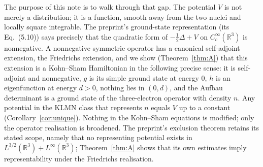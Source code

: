 \documentclass[11pt,a4paper]{article}
\theoremstyle{plain}
\theoremstyle{definition}
\theoremstyle{remark}
\newcommand{\R}{\mathbb{R}}
\newcommand{\LL}{L^{3/2}(\R^3)+L^\infty(\R^3)}
\begin{document}
The purpose of this note is to walk through that gap. The potential $V$ is not merely a distribution; it is a function, smooth away from the two nuclei and locally square integrable. The preprint's ground-state representation (its Eq.~(5.10)) says precisely that the quadratic form of $-\tfrac12\Delta+V$ on $C_c^\infty(\R^3)$ is nonnegative. A nonnegative symmetric operator has a canonical self-adjoint extension, the Friedrichs extension, and we show (Theorem~\ref{thm:A}) that this extension is a Kohn--Sham Hamiltonian in the following precise sense: it is self-adjoint and nonnegative, $g$ is its simple ground state at energy $0$, $h$ is an eigenfunction at energy $d>0$, nothing lies in $(0,d)$, and the Aufbau determinant is a ground state of the three-electron operator with density $n$. Any potential in the KLMN class that represents $n$ equals $V$ up to a constant (Corollary~\ref{cor:unique}). Nothing in the Kohn--Sham equations is modified; only the operator realisation is broadened. The preprint's exclusion theorem retains its stated scope, namely that no representing potential exists in $\LL$; Theorem~\ref{thm:A} shows that its own estimates imply representability under the Friedrichs realisation.
\end{document}
